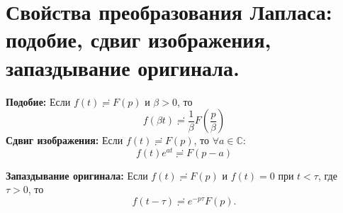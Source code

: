 \section{Свойства преобразования Лапласа: подобие, сдвиг изображения,
запаздывание
оригинала.}\label{ux441ux432ux43eux439ux441ux442ux432ux430-ux43fux440ux435ux43eux431ux440ux430ux437ux43eux432ux430ux43dux438ux44f-ux43bux430ux43fux43bux430ux441ux430-ux43fux43eux434ux43eux431ux438ux435-ux441ux434ux432ux438ux433-ux438ux437ux43eux431ux440ux430ux436ux435ux43dux438ux44f-ux437ux430ux43fux430ux437ux434ux44bux432ux430ux43dux438ux435-ux43eux440ux438ux433ux438ux43dux430ux43bux430.}

\textbf{Подобие:} Если \(f(t)\risingdotseq F(p)\) и \(\beta>0\), то \[
f(\beta t)\risingdotseq \frac{1}{\beta}F\left( \frac{p}{\beta} \right)
\] \textbf{Сдвиг изображения:} Если \(f(t)\risingdotseq F(p)\), то
\(\forall a\in \mathbb{C}:\) \[
f(t)e^{ a t }\risingdotseq F(p-a)
\]

\textbf{Запаздывание оригинала:} Если \(f(t)\risingdotseq F(p)\) и
\(f(t)=0\) при \(t<\tau\), где \(\tau>0\), то \[
f(t-\tau)\risingdotseq e^{ -p\tau }F(p).
\]

